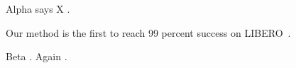 \documentclass{article}
\newcommand{\libero}{LIBERO~\cite{ka}}
\begin{document}
Alpha says X \cite{ka}.

Our method is the first to reach 99 percent success on \libero.

Beta \parencite{kb}. Again \textcite{kb}.
\printbibliography
\end{document}
